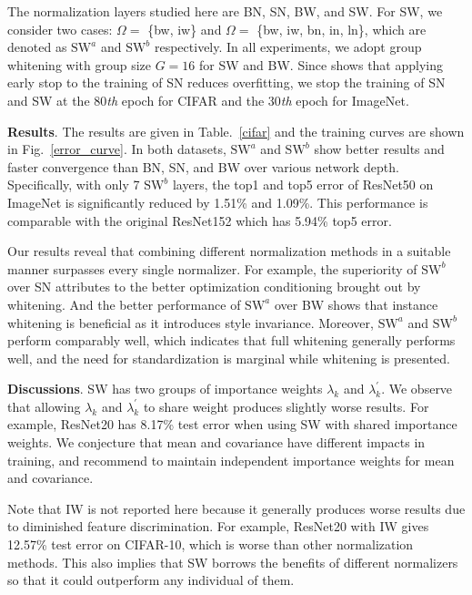 \documentclass[10pt,twocolumn,letterpaper]{article}
\begin{document}
The normalization layers studied here are BN, SN, BW, and SW.
For SW, we consider two cases: \(\Omega = \) \{bw, iw\} and \(\Omega = \) \{bw, iw, bn, in, ln\}, which are denoted as $\text{SW}^{a}$ and $\text{SW}^{b}$ respectively.
In all experiments, we adopt group whitening with group size $G = 16$ for SW and BW.
Since \cite{luo2018normalization} shows that applying early stop to the training of SN reduces overfitting, we stop the training of SN and SW at the 80\textit{th} epoch for CIFAR and the 30\textit{th} epoch for ImageNet.

\noindent\textbf{Results}.
The results are given in Table.~\ref{cifar} and the training curves are shown in Fig.~\ref{error_curve}.
In both datasets, $\text{SW}^{a}$ and $\text{SW}^{b}$ show better results and faster convergence than BN, SN, and BW over various network depth.
Specifically, with only 7 $\text{SW}^{b}$ layers, the top1 and top5 error of ResNet50 on ImageNet is significantly reduced by 1.51\% and 1.09\%.
This performance is comparable with the original ResNet152 which has 5.94\% top5 error.


Our results reveal that combining different normalization methods in a suitable manner surpasses every single normalizer.
For example, the superiority of $\text{SW}^{b}$ over SN attributes to the better optimization conditioning brought out by whitening.
And the better performance of $\text{SW}^{a}$ over BW shows that instance whitening is beneficial as it introduces style invariance.
Moreover, $\text{SW}^{a}$ and $\text{SW}^{b}$ perform comparably well, which indicates that full whitening generally performs well, and the need for standardization is marginal while whitening is presented.


\noindent\textbf{Discussions}.
SW has two groups of importance weights \(\lambda_{k}\) and \(\lambda_{k}^{\prime}\).
We observe that allowing \(\lambda_{k}\) and \(\lambda_{k}^{\prime}\) to share weight produces slightly worse results.
For example, ResNet20 has 8.17\% test error when using SW with shared importance weights.
We conjecture that mean and covariance have different impacts in training, and recommend to maintain independent importance weights for mean and covariance. 

Note that IW is not reported here because it generally produces worse results due to diminished feature discrimination.
For example, ResNet20 with IW gives 12.57\% test error on CIFAR-10, which is worse than other normalization methods.
This also implies that SW borrows the benefits of different normalizers so that it could outperform any individual of them. 
\end{document}
